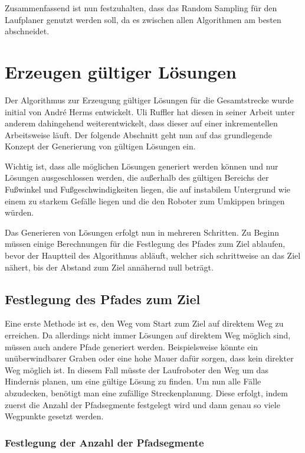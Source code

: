 Zusammenfassend ist nun festzuhalten, dass das Random Sampling für den Laufplaner genutzt werden soll, da es zwischen allen Algorithmen am besten abschneidet.

\section{Erzeugen gültiger Lösungen}

Der Algorithmus zur Erzeugung gültiger Lösungen für die Gesamtstrecke wurde initial von André Herms \autocite{herms2004} entwickelt. Uli Ruffler \autocite{ruffler2006} hat diesen in seiner Arbeit unter anderem dahingehend weiterentwickelt, dass dieser auf einer inkrementellen Arbeitsweise läuft. Der folgende Abschnitt geht nun auf das grundlegende Konzept der Generierung von gültigen Lösungen ein.

Wichtig ist, dass alle möglichen Lösungen generiert werden können und nur Lösungen ausgeschlossen werden, die außerhalb des gültigen Bereichs der Fußwinkel und Fußgeschwindigkeiten liegen, die auf instabilem Untergrund wie einem zu starkem Gefälle liegen und die den Roboter zum Umkippen bringen würden.

Das Generieren von Lösungen erfolgt nun in mehreren Schritten. Zu Beginn müssen einige Berechnungen für die Festlegung des Pfades zum Ziel ablaufen, bevor der Hauptteil des Algorithmus abläuft, welcher sich schrittweise an das Ziel nähert, bis der Abstand zum Ziel annähernd null beträgt.

\subsection{Festlegung des Pfades zum Ziel}

Eine erste Methode ist es, den Weg vom Start zum Ziel auf direktem Weg zu erreichen. Da allerdings nicht immer Lösungen auf direktem Weg möglich sind, müssen auch andere Pfade generiert werden. Beispielsweise könnte ein unüberwindbarer Graben oder eine hohe Mauer dafür sorgen, dass kein direkter Weg möglich ist. In diesem Fall müsste der Laufroboter den Weg um das Hindernis planen, um eine gültige Lösung zu finden. Um nun alle Fälle abzudecken, benötigt man eine zufällige Streckenplanung. Diese erfolgt, indem zuerst die Anzahl der Pfadsegmente festgelegt wird und dann genau so viele Wegpunkte gesetzt werden.

\subsubsection{Festlegung der Anzahl der Pfadsegmente}

